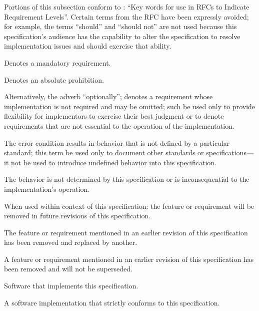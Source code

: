 %

Portions of this subsection conform to : ``Key words for use in RFCs
to Indicate Requirement Levels''. Certain terms from the RFC have been expressly
avoided; for example, the terms ``should'' and ``should not'' are not used
because this specification's audience has the capability to alter the
specification to resolve implementation issues and should exercise that ability.

\begin{description}
  Denotes a mandatory requirement.

  Denotes an absolute prohibition.

  Alternatively, the adverb ``optionally''; denotes a requirement whose
  implementation is not required and may be omitted; such \shall be used only to
  provide flexibility for implementors to exercise their best judgment or to
  denote requirements that are not essential to the operation of the
  implementation.

  The error condition results in behavior that is not defined by a particular
  standard; this term \shall be used only to document other standards or
  specifications---it \shall not be used to introduce undefined behavior into
  this specification.

  The behavior is not determined by this specification or is inconsequential to
  the implementation's operation.

  When used within context of this specification: the feature or requirement
  will be removed in future revisions of this specification.

  The feature or requirement mentioned in an earlier revision of this
  specification has been removed and replaced by another.

  A feature or requirement mentioned in an earlier revision of this
  specification has been removed and will not be superseded.

  Software that implements this specification.

  A software implementation that strictly conforms to this specification.
\end{description}
